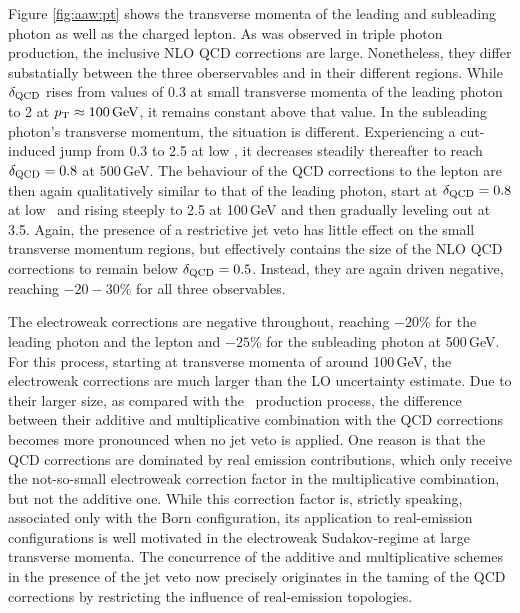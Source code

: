 Figure \ref{fig:aaw:pt} shows the transverse momenta of 
the leading and subleading photon as well as the charged 
lepton. 
As was observed in triple photon production, the inclusive 
NLO QCD corrections are large. 
Nonetheless, they differ substatially between the three 
oberservables and in their different regions. 
While $\delta_\text{QCD}$ rises from values of 0.3 at small 
transverse momenta of the leading photon to 2 at 
$p_\text{T}\approx 100\,\text{GeV}$, it remains constant above that 
value.
In the subleading photon's transverse momentum, the 
situation is different. 
Experiencing a cut-induced jump from 0.3 to 2.5 at low \pT, 
it decreases steadily thereafter to reach $\delta_\text{QCD}=0.8$ 
at 500\,GeV. 
The behaviour of the QCD corrections to the lepton \pT are 
then again qualitatively similar to that of the leading 
photon, start at $\delta_\text{QCD}=0.8$ at low \pT \, and rising 
steeply to 2.5 at 100\,GeV and then gradually leveling out 
at 3.5. 
Again, the presence of a restrictive jet veto has little 
effect on the small transverse momentum regions, but 
effectively contains the size of the NLO QCD corrections 
to remain below $\delta_\text{QCD}=0.5$. 
Instead, they are again driven negative, reaching 
$-20-30\%$ for all three observables. 

The electroweak corrections are negative throughout, 
reaching $-20\%$ for the leading photon and the lepton 
and $-25\%$ for the subleading photon at 500\,GeV. 
For this process, starting at transverse momenta of 
around 100\,GeV, the electroweak corrections are much 
larger than the LO uncertainty estimate.
Due to their larger size, as compared with the \aaa\ 
production process, the difference between their 
additive and multiplicative combination with the 
QCD corrections becomes more pronounced when no 
jet veto is applied. 
One reason is that the QCD corrections are dominated 
by real emission contributions, which only receive the 
not-so-small electroweak correction factor in the 
multiplicative combination, but not the additive one. 
While this correction factor is, strictly speaking, 
associated only with the Born configuration, its 
application to real-emission configurations is well 
motivated in the electroweak Sudakov-regime at 
large transverse momenta. 
The concurrence of the additive and multiplicative 
schemes in the presence of the jet veto now precisely 
originates in the taming of the QCD corrections by 
restricting the influence of real-emission topologies. 

